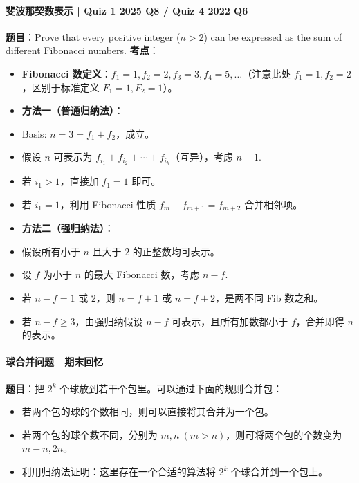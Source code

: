 \documentclass[10pt,a4paper,openany]{ctexbook}
\theoremstyle{definition}
\theoremstyle{remark}
\begin{document}
\paragraph{斐波那契数表示 | Quiz 1 2025 Q8 / Quiz 4 2022 Q6}

\textbf{题目}：Prove that every positive integer ($n > 2$) can be expressed as the sum of different Fibonacci numbers.
\textbf{考点}：
\begin{itemize}
\item \textbf{Fibonacci 数定义}：$f_1 = 1, f_2 = 2, f_3 = 3, f_4 = 5, \dots$（注意此处 $f_1=1, f_2=2$，区别于标准定义 $F_1=1, F_2=1$）。
\item \textbf{方法一（普通归纳法）}：
\item Basis: $n=3 = f_1 + f_2$，成立。
\item 假设 $n$ 可表示为 $f_{i_1} + f_{i_2} + \cdots + f_{i_k}$（互异），考虑 $n+1$.
\item 若 $i_1 > 1$，直接加 $f_1 = 1$ 即可。
\item 若 $i_1 = 1$，利用 Fibonacci 性质 $f_m + f_{m+1} = f_{m+2}$ 合并相邻项。
\item \textbf{方法二（强归纳法）}：
\item 假设所有小于 $n$ 且大于 2 的正整数均可表示。
\item 设 $f$ 为小于 $n$ 的最大 Fibonacci 数，考虑 $n - f$.
\item 若 $n - f = 1$ 或 $2$，则 $n = f + 1$ 或 $n = f + 2$，是两不同 Fib 数之和。
\item 若 $n - f \ge 3$，由强归纳假设 $n-f$ 可表示，且所有加数都小于 $f$，合并即得 $n$ 的表示。

\end{itemize}

\vspace{-2pt}

\paragraph{球合并问题 | 期末回忆}

\textbf{题目}：把 $2^k$ 个球放到若干个包里。可以通过下面的规则合并包：
\begin{itemize}
\item 若两个包的球的个数相同，则可以直接将其合并为一个包。
\item 若两个包的球个数不同，分别为 $m, n\ (m > n)$，则可将两个包的个数变为 $m-n, 2n$。
\item 利用归纳法证明：这里存在一个合适的算法将 $2^k$ 个球合并到一个包上。

\end{itemize}
\end{document}
